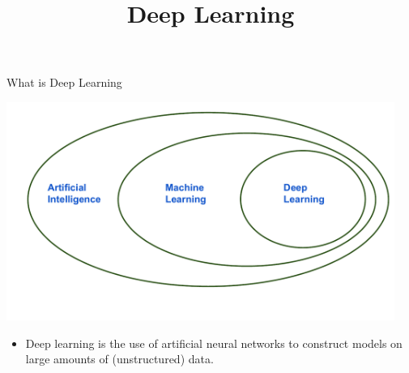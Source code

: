 




\newcommand{\titlefigure}{figure/bird4.pdf}
\newcommand{\learninggoals}{
  \item Relationship of DL and ML
  \item Concept of representation or feature learning
  \item Use-cases and data types for DL methods
}

\title{Deep Learning}
\date{}



\begin{frame} {What is Deep Learning}
\begin{center}
\includegraphics[width=0.95\textwidth]{figure/learning.pdf}
\end{center}
\vspace{-.5cm}
\begin{itemize}
\item Deep learning is the use of artificial neural networks to
construct models on large amounts of (unstructured) data.
\end{itemize}
\end{frame}

